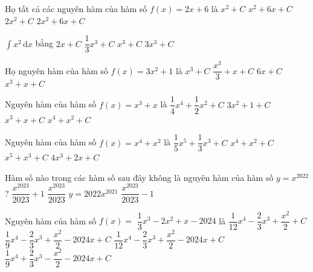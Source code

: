 \begin{ex}%
	Họ tất cả các nguyên hàm của hàm số $f(x)=2x+6$ là
	\choice
	{$x^2+C$}
	{\True $x^2+6x+C$}
	{$2x^2+C$}
	{$2x^2+6x+C$}
\end{ex}

\begin{ex}%
	$\displaystyle\int{x^2\mathrm{\,d}x}$ bằng
	\choice
	{$2x+C$}
	{\True $\dfrac{1}{3}x^3+C$}
	{$x^3+C$}
	{$3x^3+C$}
\end{ex}

\begin{ex}%
	Họ nguyên hàm của hàm số $f(x)=3x^2+1$ là
	\choice
	{$x^3+C$}
	{$\dfrac{x^3}{3}+x+C$}
	{$6x+C$}
	{\True $x^3+x+C$}
\end{ex}

\begin{ex}%
	Nguyên hàm của hàm số $f(x)=x^3+x$ là
	\choice
	{\True $\dfrac{1}{4}x^4+\dfrac{1}{2}x^2+C$}
	{$3x^2+1+C$}
	{$x^3+x+C$}
	{$x^4+x^2+C$}
\end{ex}

\begin{ex}%
	Nguyên hàm của hàm số $f(x)=x^4+x^2$ là
	\choice
	{\True $\dfrac{1}{5}x^5+\dfrac{1}{3}x^3+C$}
	{$x^4+x^2+C$}
	{$x^5+x^3+C$}
	{$4x^3+2x+C$}
\end{ex}

\begin{ex}%
	Hàm số nào trong các hàm số sau đây không là nguyên hàm của hàm số $y=x^{2022}$?
	\choice
	{$\dfrac{x^{2023}}{2023}+1$}
	{$\dfrac{x^{2023}}{2023}$}
	{\True $y=2022x^{2021}$}
	{$\dfrac{x^{2023}}{2023}-1$}
\end{ex}

\begin{ex}%
	Nguyên hàm của hàm số $f(x)=$ $\dfrac{1}{3}x^3-2x^2+x-2024$ là
	\choice
	{$\dfrac{1}{12}x^4-\dfrac{2}{3}x^3+\dfrac{x^2}{2}+C$}
	{$\dfrac{1}{9}x^4-\dfrac{2}{3}x^3+\dfrac{x^2}{2}-2024x+C$}
	{\True $\dfrac{1}{12}x^4-\dfrac{2}{3}x^3+\dfrac{x^2}{2}-2024x+C$}
	{$\dfrac{1}{9}x^4+\dfrac{2}{3}x^3-\dfrac{x^2}{2}-2024x+C$}
\end{ex}

